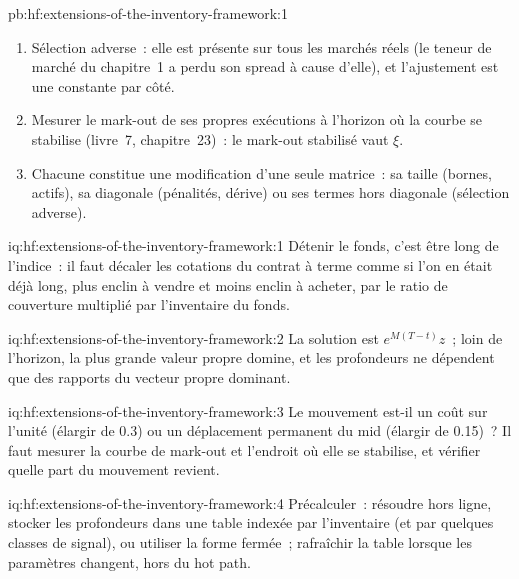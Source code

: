 \begin{solution}{pb:hf:extensions-of-the-inventory-framework:1}
\begin{enumerate}
avec un quart du pas, elle s'accorde avec lui.
\item Sélection adverse~: elle est présente sur tous les marchés réels (le teneur de marché du chapitre~1 a perdu son spread à cause d'elle), et l'ajustement est une constante par côté.
\item Mesurer le mark-out de ses propres exécutions à l'horizon où la courbe se stabilise (livre~7, chapitre~23)~: le mark-out stabilisé vaut $\xi$.
\item Chacune constitue une modification d'une seule matrice~: sa taille (bornes, actifs), sa diagonale (pénalités, dérive) ou ses termes hors diagonale (sélection adverse).
\end{enumerate}
\end{solution}

\begin{solution}{iq:hf:extensions-of-the-inventory-framework:1}
Détenir le fonds, c'est être long de l'indice~: il faut décaler les cotations du contrat à terme comme si l'on en était déjà long, plus enclin à vendre et moins enclin à acheter, par
le ratio de couverture multiplié par l'inventaire du fonds.
\end{solution}

\begin{solution}{iq:hf:extensions-of-the-inventory-framework:2}
La solution est $e^{M(T-t)}z$~; loin de l'horizon, la plus grande valeur propre domine, et les profondeurs ne dépendent que des rapports du vecteur propre dominant.
\end{solution}

\begin{solution}{iq:hf:extensions-of-the-inventory-framework:3}
Le mouvement est-il un coût sur l'unité (élargir de 0.3) ou un déplacement permanent du mid (élargir de 0.15)~? Il faut mesurer la courbe de mark-out et l'endroit où elle se stabilise,
et vérifier quelle part du mouvement revient.
\end{solution}

\begin{solution}{iq:hf:extensions-of-the-inventory-framework:4}
Précalculer~: résoudre hors ligne, stocker les profondeurs dans une table indexée par l'inventaire (et par quelques classes de signal), ou utiliser la forme fermée~; rafraîchir la table
lorsque les paramètres changent, hors du hot path.
\end{solution}

